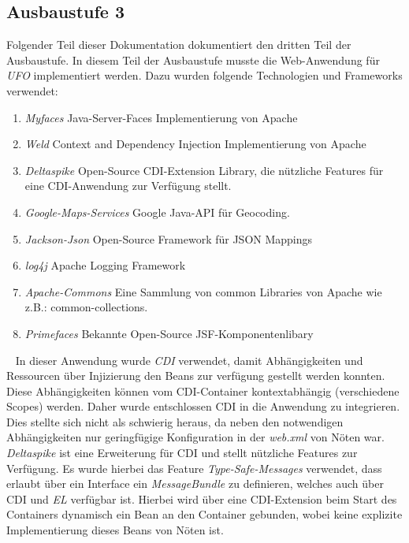 \documentclass[11pt, a4paper, twoside]{article}   	%
\begin{document}
\subsection{Ausbaustufe 3}
Folgender Teil dieser Dokumentation dokumentiert den dritten Teil der Ausbaustufe. In diesem Teil der Ausbaustufe musste die Web-Anwendung für \emph{UFO} implementiert werden. Dazu wurden folgende Technologien und Frameworks verwendet:
\begin{enumerate}
	\item\emph{Myfaces}
	\newline
	Java-Server-Faces Implementierung von Apache
	\item\emph{Weld}
	\newline
	Context and Dependency Injection Implementierung von Apache
	\item\emph{Deltaspike}
	\newline
	Open-Source CDI-Extension Library, die nützliche Features für eine CDI-Anwendung zur Verfügung stellt.
	\item\emph{Google-Maps-Services}
	\newline
	Google Java-API für Geocoding.
	\item\emph{Jackson-Json}
	\newline
	Open-Source Framework für JSON Mappings
	\item\emph{log4j}
	\newline
	Apache Logging Framework
	\item\emph{Apache-Commons}
	\newline
	Eine Sammlung von common Libraries von Apache wie z.B.: common-collections.
	\item\emph{Primefaces}
	\newline
	Bekannte Open-Source JSF-Komponentenlibary
\end{enumerate}
\ \newline
In dieser Anwendung wurde \emph{CDI} verwendet, damit Abhängigkeiten und Ressourcen über 
Injizierung den Beans zur verfügung gestellt werden konnten. Diese Abhängigkeiten können vom CDI-Container kontextabhängig (verschiedene Scopes) werden. Daher wurde entschlossen CDI in die Anwendung zu integrieren. Dies stellte sich nicht als schwierig heraus, da neben den notwendigen Abhängigkeiten nur geringfügige Konfiguration in der \emph{web.xml} von Nöten war.
\newline
\newline
\emph{Deltaspike} ist eine Erweiterung für CDI und stellt nützliche Features zur Verfügung. Es wurde hierbei das Feature \emph{Type-Safe-Messages} verwendet, dass erlaubt über ein Interface ein \emph{MessageBundle} zu definieren, welches auch über CDI und \emph{EL} verfügbar ist. Hierbei wird über eine CDI-Extension beim Start des Containers dynamisch ein Bean an den Container gebunden, wobei keine explizite Implementierung dieses Beans von Nöten ist.
\end{document}
